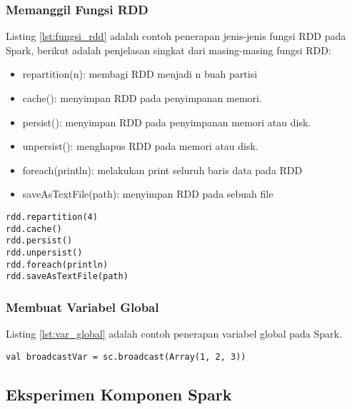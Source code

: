 \subsubsection{Memanggil Fungsi RDD}
\noindent Listing \ref{lst:fungsi_rdd} adalah contoh penerapan jenis-jenis fungsi RDD pada Spark, berikut adalah penjelasan singkat dari masing-masing fungsi RDD:

\begin{itemize}
\item repartition(n): membagi RDD menjadi n buah partisi
\item cache(): menyimpan RDD pada penyimpanan memori.
\item persist(): menyimpan RDD pada penyimpanan memori atau disk.
\item unpersist(): menghapus RDD pada memori atau disk.
\item foreach(println): melakukan print seluruh baris data pada RDD
\item saveAsTextFile(path): menyimpan RDD pada sebuah file
\end{itemize}

\begin{lstlisting}[basicstyle=\ttfamily, frame=single,
	columns=fullflexible, keepspaces=true, breaklines=true, label=lst:fungsi_rdd, caption=Contoh Fungsi RDD]
rdd.repartition(4)
rdd.cache() 
rdd.persist() 
rdd.unpersist()
rdd.foreach(println)
rdd.saveAsTextFile(path)

\end{lstlisting}

\subsubsection{Membuat Variabel Global}
\noindent Listing \ref{lst:var_global} adalah contoh penerapan variabel global pada Spark.
\begin{lstlisting}[basicstyle=\ttfamily, frame=single,
	columns=fullflexible, keepspaces=true, breaklines=true, label=lst:var_global, caption=Membuat Variabel Global]
val broadcastVar = sc.broadcast(Array(1, 2, 3))
\end{lstlisting}	

\newpage
\subsection{Eksperimen Komponen Spark}
